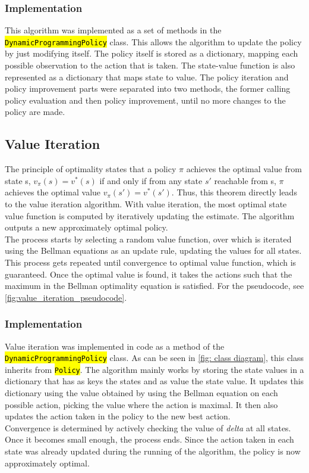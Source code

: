 \documentclass{class}
\def\code#1{\hl{\texttt{#1}}}
\begin{document}
\subsubsection{Implementation}
This algorithm was implemented as a set of methods in the \code{DynamicProgrammingPolicy} class. This allows the algorithm to update the policy by just modifying itself. The policy itself is stored as a dictionary, mapping each possible observation to the action that is taken. The state-value function is also represented as a dictionary that maps state to value. The policy iteration and policy improvement parts were separated into two methods, the former calling policy evaluation and then policy improvement, until no more changes to the policy are made.

\subsection{Value Iteration}
The principle of optimality states that a policy $\pi$ achieves the optimal value from state s, $v_\pi(s) = v^*(s)$ if and only if from any state $s'$ reachable from s, $\pi$ achieves the optimal value $v_\pi(s') = v^*(s')$. Thus, this theorem directly leads to the value iteration algorithm. With value iteration, the most optimal state value function is computed by iteratively updating the estimate. The algorithm outputs a new approximately optimal policy.
\\[0.3cm]
The process starts by selecting a random value function, over which is iterated using the Bellman equations as an update rule, updating the values for all states. This process gets repeated until convergence to optimal value function, which is guaranteed. Once the optimal value is found, it takes the actions such that the maximum in the Bellman optimality equation is satisfied. For the pseudocode, see \autoref{fig:value_iteration_pseudocode}.

\subsubsection{Implementation}
Value iteration was implemented in code as a method of the \code{DynamicProgrammingPolicy} class. As can be seen in \autoref{fig: class diagram}, this class inherits from \code{Policy}. The algorithm mainly works by storing the state values in a dictionary that has as keys the states and as value the state value. It updates this dictionary using the value obtained by using the Bellman equation on each possible action, picking the value where the action is maximal. It then also updates the action taken in the policy to the new best action.
\\[0.3cm]
Convergence is determined by actively checking the value of \textit{delta} at all states. Once it becomes small enough, the process ends. Since the action taken in each state was already updated during the running of the algorithm, the policy is now approximately optimal.
\end{document}
